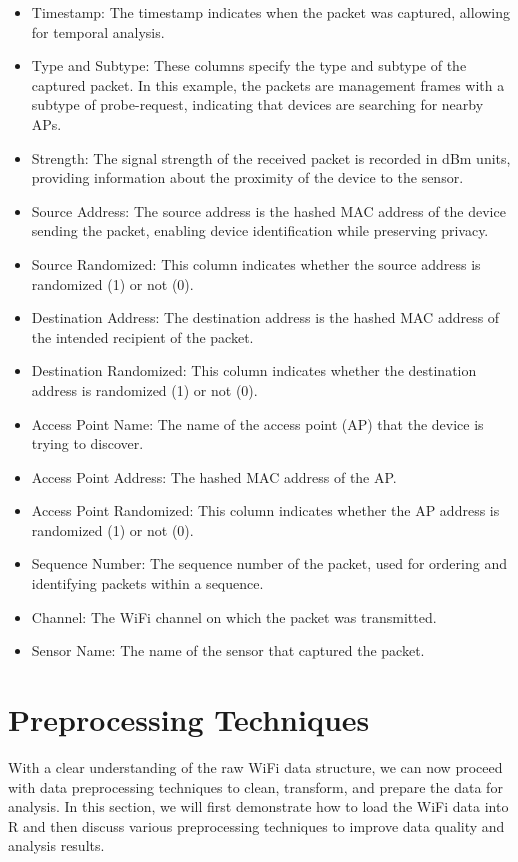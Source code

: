 \documentclass[
  letterpaper,
]{scrbook}
\providecommand{\tightlist}{%
  \setlength{\itemsep}{0pt}\setlength{\parskip}{0pt}}\usepackage{longtable,booktabs,array}
\begin{document}
\begin{itemize}
\tightlist
\item
  Timestamp: The timestamp indicates when the packet was captured,
  allowing for temporal analysis.
\item
  Type and Subtype: These columns specify the type and subtype of the
  captured packet. In this example, the packets are management frames
  with a subtype of probe-request, indicating that devices are searching
  for nearby APs.
\item
  Strength: The signal strength of the received packet is recorded in
  dBm units, providing information about the proximity of the device to
  the sensor.
\item
  Source Address: The source address is the hashed MAC address of the
  device sending the packet, enabling device identification while
  preserving privacy.
\item
  Source Randomized: This column indicates whether the source address is
  randomized (1) or not (0).
\item
  Destination Address: The destination address is the hashed MAC address
  of the intended recipient of the packet.
\item
  Destination Randomized: This column indicates whether the destination
  address is randomized (1) or not (0).
\item
  Access Point Name: The name of the access point (AP) that the device
  is trying to discover.
\item
  Access Point Address: The hashed MAC address of the AP.
\item
  Access Point Randomized: This column indicates whether the AP address
  is randomized (1) or not (0).
\item
  Sequence Number: The sequence number of the packet, used for ordering
  and identifying packets within a sequence.
\item
  Channel: The WiFi channel on which the packet was transmitted.
\item
  Sensor Name: The name of the sensor that captured the packet.
\end{itemize}

\chapter{Preprocessing Techniques}\label{preprocessing-techniques}

With a clear understanding of the raw WiFi data structure, we can now
proceed with data preprocessing techniques to clean, transform, and
prepare the data for analysis. In this section, we will first
demonstrate how to load the WiFi data into R and then discuss various
preprocessing techniques to improve data quality and analysis results.
\end{document}
